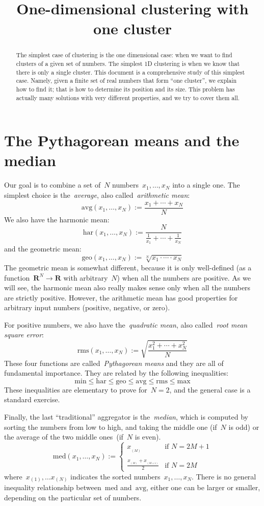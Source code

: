 \documentclass[a4paper]{article}
\title{One-dimensional clustering with one cluster}
\date{}
\author{}
\def\R{\mathbf{R}}
\begin{document}
\maketitle
\begin{abstract}
	The simplest case of clustering is the one dimensional case:
	when we want to find clusters of a given set of numbers.  The
	simplest 1D clustering is when we know that there is only a
	single cluster.  This document is a comprehensive study of
	this simplest case.  Namely, given a finite set of real
	numbers that form ``one cluster'', we explain how to find it;
	that is how to determine its position and its size.  This
	problem has actually many solutions with very different
	properties, and we try to cover them all.
\end{abstract}

\section{The Pythagorean means and the median}

Our goal is to combine a set of~$N$ numbers~$x_1,\ldots,x_N$ into a
single one.  The simplest choice is the~\emph{average}, also
called~\emph{arithmetic mean}:
\[
	\mathrm{avg}(x_1,\ldots,x_N) := \frac{x_1+\cdots+x_N}{N}
\]
We also have the harmonic mean:
\[
	\mathrm{har}(x_1,\ldots,x_N) :=
	\frac{N}{\frac{1}{x_1}+\cdots+\frac{1}{x_N}}
\]
and the geometric mean:
\[
	\mathrm{geo}(x_1,\ldots,x_N) :=
	\sqrt[N]{x_1\cdot \cdots\cdot x_N}
\]
The geometric mean is somewhat different, because it is only
well-defined (as a function~$\R^N\to\R$ with arbitrary~$N$)
when all the numbers are positive.  As we will see, the harmonic mean
also really makes sense only when all the numbers are strictly positive.
However, the arithmetic mean has good properties for arbitrary input
numbers (positive, negative, or zero).

For positive numbers, we also have the~\emph{quadratic mean}, also
called~\emph{root mean square error}:
\[
	\mathrm{rms}(x_1,\ldots,x_N) :=
	\sqrt{\frac{x_1^2+\cdots+x_N^2}{N}}
\]
These four functions are called~\emph{Pythagorean means} and they are
all of fundamental importance.  They are related by the following
inequalities:
\[
	\mathrm{min}
	\le \mathrm{har}
	\le \mathrm{geo}
	\le \mathrm{avg}
	\le \mathrm{rms}
	\le \mathrm{max}
\]
These inequalities are elementary to prove for~$N=2$, and the general
case is a standard exercise.

Finally, the last ``traditional'' aggregator is the~\emph{median},
which is computed by sorting the numbers from low to high, and taking
the middle one (if~$N$ is odd) or the average of the two middle
ones~(if~$N$ is even).
\[
	\mathrm{med}(x_1,\ldots,x_N):=
	\begin{cases}
		x_{{}_{(M)}} & \textrm{if~$N=2M+1$} \\
		&\\
		\displaystyle\frac{x_{{}_{(M)}}
		+ x_{{}_{(M+1)}}}{2}
			& \textrm{if~$N=2M$}
	\end{cases}
\]
where~$x_{(1)},\ldots x_{(N)}$ indicates the sorted
numbers~$x_1,\ldots,x_N$.  There is no general inequality
relationship between~$\mathrm{med}$ and~$\mathrm{avg}$, either one can be larger or
smaller, depending on the particular set of numbers.
\end{document}
